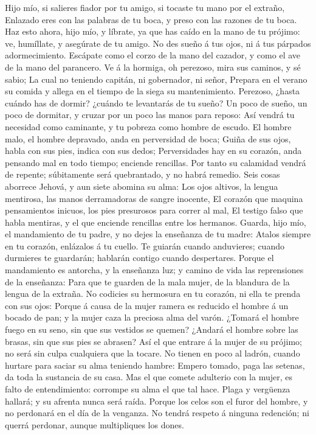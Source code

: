  Hijo mío, si salieres fiador por tu amigo, si tocaste tu
mano por el extraño,  Enlazado eres con las palabras de tu
boca, y preso con las razones de tu boca.  Haz esto ahora,
hijo mío, y líbrate, ya que has caído en la mano de tu prójimo: ve,
humíllate, y asegúrate de tu amigo.  No des sueño á tus
ojos, ni á tus párpados adormecimiento.  Escápate como el
corzo de la mano del cazador, y como el ave de la mano del parancero.
 Ve á la hormiga, oh perezoso, mira sus caminos, y sé
sabio;  La cual no teniendo capitán, ni gobernador, ni
señor,  Prepara en el verano su comida y allega en el
tiempo de la siega su mantenimiento.  Perezoso, ¿hasta
cuándo has de dormir? ¿cuándo te levantarás de tu sueño? 
Un poco de sueño, un poco de dormitar, y cruzar por un poco las manos
para reposo:  Así vendrá tu necesidad como caminante, y
tu pobreza como hombre de escudo.  El hombre malo, el
hombre depravado, anda en perversidad de boca;  Guiña de
sus ojos, habla con sus pies, indica con sus dedos; 
Perversidades hay en su corazón, anda pensando mal en todo tiempo;
enciende rencillas.  Por tanto su calamidad vendrá de
repente; súbitamente será quebrantado, y no habrá remedio.
 Seis cosas aborrece Jehová, y aun siete abomina su alma:
 Los ojos altivos, la lengua mentirosa, las manos
derramadoras de sangre inocente,  El corazón que maquina
pensamientos inicuos, los pies presurosos para correr al mal,
 El testigo falso que habla mentiras, y el que enciende
rencillas entre los hermanos.  Guarda, hijo mío, el
mandamiento de tu padre, y no dejes la enseñanza de tu madre:
 Atalos siempre en tu corazón, enlázalos á tu cuello.
 Te guiarán cuando anduvieres; cuando durmieres te
guardarán; hablarán contigo cuando despertares.  Porque
el mandamiento es antorcha, y la enseñanza luz; y camino de vida las
reprensiones de la enseñanza:  Para que te guarden de la
mala mujer, de la blandura de la lengua de la extraña. 
No codicies su hermosura en tu corazón, ni ella te prenda con sus ojos:
 Porque á causa de la mujer ramera es reducido el hombre
á un bocado de pan; y la mujer caza la preciosa alma del varón.
 ¿Tomará el hombre fuego en su seno, sin que sus vestidos
se quemen?  ¿Andará el hombre sobre las brasas, sin que
sus pies se abrasen?  Así el que entrare á la mujer de su
prójimo; no será sin culpa cualquiera que la tocare.  No
tienen en poco al ladrón, cuando hurtare para saciar su alma teniendo
hambre:  Empero tomado, paga las setenas, da toda la
sustancia de su casa.  Mas el que comete adulterio con la
mujer, es falto de entendimiento: corrompe su alma el que tal hace.
 Plaga y vergüenza hallará; y su afrenta nunca será
raída.  Porque los celos son el furor del hombre, y no
perdonará en el día de la venganza.  No tendrá respeto á
ninguna redención; ni querrá perdonar, aunque multipliques los dones.

